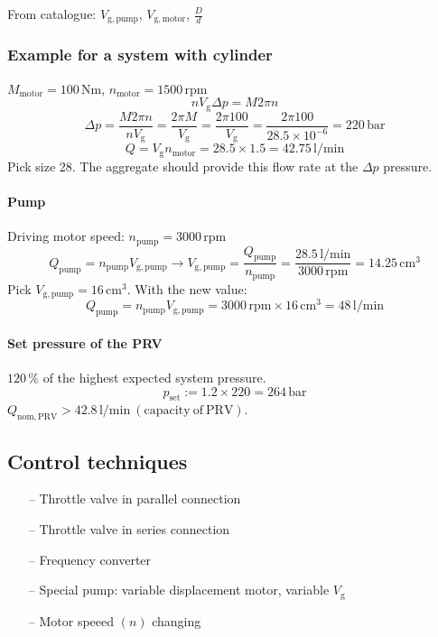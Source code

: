 From catalogue: $V_{\mathrm{g,pump}}$, $V_{\mathrm{g,motor}}$, $\frac{D}{d}$
\subsubsection{Example for a system with cylinder}
$M_{\mathrm{motor}}=100\,\mathrm{Nm}$, $n_{\mathrm{motor}}=1500\,\mathrm{rpm}$
\begin{equation}
nV_{\mathrm{g}}\Delta p=M2\pi n
\end{equation}
\begin{equation}
\Delta p=\frac{M2\pi n}{n V_{\mathrm{g}}}=\frac{2\pi M}{V_{\mathrm{g}}}=\frac{2\pi 100}{V_{\mathrm{g}}}=\frac{2\pi 100}{28.5\times10^{-6}}=220\,\mathrm{bar}
\end{equation}
\begin{equation}
Q={V_{\mathrm{g}}}n_{\mathrm{motor}}=28.5\times 1.5=42.75\,\mathrm{l/min}
\end{equation}
Pick size 28. The aggregate should provide this flow rate at the $\Delta p$ pressure.
\paragraph{Pump}
Driving motor speed: $n_{\mathrm{pump}}=3000\,\mathrm{rpm}$
\begin{equation}
Q_{\mathrm{pump}}=n_{\mathrm{pump}}V_{\mathrm{g,pump}}\rightarrow V_{\mathrm{g,pump}}=\frac{Q_{\mathrm{pump}}}{n_{\mathrm{pump}}}=\frac{28.5\,\mathrm{l/min}}{3000\,\mathrm{rpm}}=14.25\,{\mathrm{cm^3}}
\end{equation}
Pick $V_{\mathrm{g,pump}}=16\,{\mathrm{cm^3}}$.
With the new value:
\begin{equation}
Q_{\mathrm{pump}}=n_{\mathrm{pump}}V_{\mathrm{g,pump}}=3000\,\mathrm{rpm}\times 16\,\mathrm{cm^3}=48\,\mathrm{l/min}
\end{equation}
\paragraph{Set pressure of the PRV}
$120\,\mathrm{\%}$ of the highest expected system pressure.
\begin{equation}
p_{\mathrm{set}}:=1.2\times 220=264\,\mathrm{bar}
\end{equation}
$Q_{\mathrm{nom,PRV}}>42.8\,\mathrm{l/min}\ \mathrm{(capacity\ of\ PRV)}$.
\subsection{Control techniques}
\begin{itemize}
\item[--] Throttle valve in parallel connection
\item[--] Throttle valve in series connection
\item[--] Frequency converter
\item[--] Special pump: variable displacement motor, variable $V_{\mathrm{g}}$
\item[--] Motor speeed $(n)$ changing
\end{itemize}
